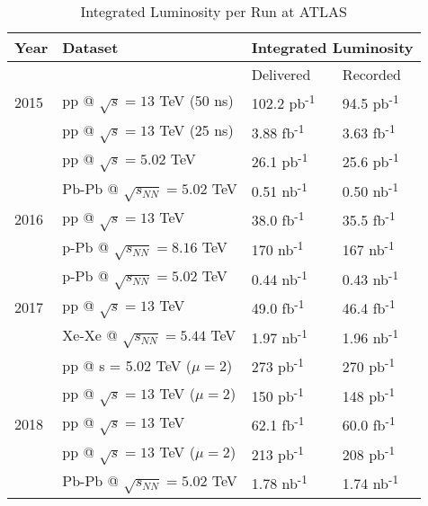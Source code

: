 \begin{table} \centering
\caption{Integrated Luminosity per Run at ATLAS \cite{data_quality}}
\label{tab:dataset_lum}
\begin{tabular}{|l|l|l|l|}
\hline
Year & Dataset                              & \multicolumn{2}{c|}{Integrated Luminosity}  \\
\hline
     &                                      & Delivered    & Recorded    \\
\hline
2015 & pp @ $\sqrt{s} = 13$ TeV (50 ns)     &  102.2  pb\textsuperscript{-1}   & 94.5  pb\textsuperscript{-1}  \\
     & pp @ $\sqrt{s} = 13$ TeV (25 ns)     &  3.88   fb\textsuperscript{-1}   & 3.63  fb\textsuperscript{-1}  \\
     & pp @ $\sqrt{s} = 5.02$ TeV           &  26.1   pb\textsuperscript{-1}   & 25.6  pb\textsuperscript{-1}  \\
     & Pb-Pb @ $\sqrt{s_{NN}} = 5.02$ TeV   &  0.51   nb\textsuperscript{-1}   &  0.50 nb\textsuperscript{-1}  \\
\hline
2016 & pp @ $\sqrt{s} = 13$ TeV             &  38.0   fb\textsuperscript{-1}   & 35.5  fb\textsuperscript{-1}  \\
     & p-Pb @ $\sqrt{s_{NN}} = 8.16$ TeV    &  170    nb\textsuperscript{-1}   & 167   nb\textsuperscript{-1}  \\
     & p-Pb @ $\sqrt{s_{NN}} = 5.02$ TeV    &  0.44   nb\textsuperscript{-1}   &  0.43 nb\textsuperscript{-1}  \\
\hline
2017 & pp @ $\sqrt{s} = 13$ TeV             &  49.0   fb\textsuperscript{-1}   & 46.4  fb\textsuperscript{-1}  \\
     & Xe-Xe @ $\sqrt{s_{NN}} = 5.44$ TeV   &  1.97   nb\textsuperscript{-1}   &  1.96 nb\textsuperscript{-1}  \\
     & pp @ s = 5.02 TeV ($\mu=2$)          &  273    pb\textsuperscript{-1}   & 270   pb\textsuperscript{-1}  \\
     & pp @ $\sqrt{s} = 13$ TeV ($\mu=2$)   &  150    pb\textsuperscript{-1}   & 148   pb\textsuperscript{-1}  \\
\hline
2018 & pp @ $\sqrt{s} = 13$ TeV             &  62.1   fb\textsuperscript{-1}   & 60.0  fb\textsuperscript{-1}  \\
     & pp @ $\sqrt{s} = 13$ TeV ($\mu=2$)   &  213    pb\textsuperscript{-1}   & 208   pb\textsuperscript{-1}  \\
     & Pb-Pb @ $\sqrt{s_{NN}} = 5.02$ TeV   &  1.78   nb\textsuperscript{-1}   &  1.74 nb\textsuperscript{-1}  \\ 
\hline
\end{tabular} \end{table}
